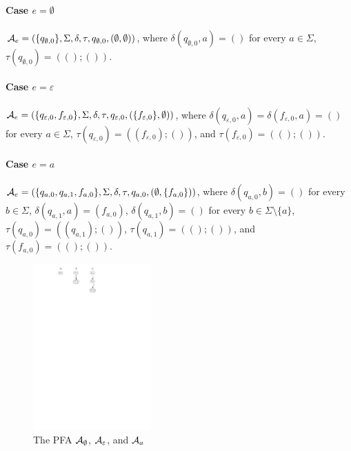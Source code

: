 \paragraph{Case $e =\emptyset$} $\mathcal{A}_e = (\{q_{\emptyset, 0}\}, \Sigma, \delta, \tau, q_{\emptyset, 0}, (\emptyset, \emptyset))$, where $\delta(q_{\emptyset, 0}, a) = ()$ for every $a \in \Sigma$, $\tau(q_{\emptyset, 0}) = ((); ())$.
		

\paragraph{Case $e = \varepsilon$} $\mathcal{A}_e = (\{q_{\varepsilon, 0}, f_{\varepsilon,0}\}, \Sigma, \delta, \tau, q_{\varepsilon,0}, (\{f_{\varepsilon,0}\}, \emptyset))$, where  $\delta(q_{\varepsilon,0}, a) = \delta(f_{\varepsilon,0}, a) = ()$ for every $a \in \Sigma$, $\tau(q_{\varepsilon,0}) = ((f_{\varepsilon,0}); ())$, and $\tau(f_{\varepsilon,0}) = ((); ())$. 
		
\paragraph{Case $e = a$} $\mathcal{A}_e = (\{q_{a,0}, q_{a,1}, f_{a,0}\}, \Sigma, \delta, \tau, q_{a,0}, (\emptyset, \{f_{a,0}\}))$, where $\delta(q_{a,0}, b) = ()$ for every $b \in \Sigma$, $\delta(q_{a,1}, a) = (f_{a,0})$, $\delta(q_{a,1}, b) = ()$ for every $b \in \Sigma \setminus \{a\}$, $\tau(q_{a,0}) = ((q_{a,1}); ())$, $\tau(q_{a,1}) = ((); ())$, and $\tau(f_{a,0}) = ((); ())$.
%		
\begin{figure}[ht]
			\centering
			\includegraphics[width = 0.4\textwidth]{reg2pfa-0.pdf}
			\caption{The PFA $\mathcal{A}_{\emptyset}$, $\mathcal{A}_{\varepsilon}$, and $\mathcal{A}_{a}$ }
			\label{fig-reg2pfa-0}
\end{figure}  


